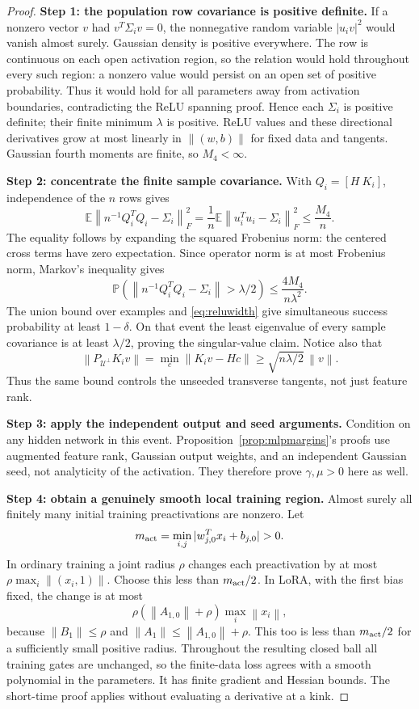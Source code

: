 \documentclass[12pt,a4paper]{article}
\theoremstyle{readable}
\theoremstyle{definition}\newtheorem{example}[theorem]{Example}
\newcommand{\norm}[1]{\left\|#1\right\|}
\begin{document}
\begin{proof}
\textbf{Step 1: the population row covariance is positive definite.} If a nonzero vector \(v\) had \(v^T\Sigma_iv=0\), the nonnegative random variable \(|u_iv|^2\) would vanish almost surely. Gaussian density is positive everywhere. The row is continuous on each open activation region, so the relation would hold throughout every such region: a nonzero value would persist on an open set of positive probability. Thus it would hold for all parameters away from activation boundaries, contradicting the ReLU spanning proof. Hence each \(\Sigma_i\) is positive definite; their finite minimum \(\lambda\) is positive. ReLU values and these directional derivatives grow at most linearly in \(\norm{(w,b)}\) for fixed data and tangents. Gaussian fourth moments are finite, so \(M_4<\infty\).

\textbf{Step 2: concentrate the finite sample covariance.} With \(Q_i=[H\ K_i]\), independence of the \(n\) rows gives
\[
\mathbb E\norm{n^{-1}Q_i^TQ_i-\Sigma_i}_F^2
=\frac1n\mathbb E\norm{u_i^Tu_i-\Sigma_i}_F^2
\le\frac{M_4}{n}.
\]
The equality follows by expanding the squared Frobenius norm: the centered cross terms have zero expectation. Since operator norm is at most Frobenius norm, Markov's inequality gives
\[
\mathbb P\!\left(\norm{n^{-1}Q_i^TQ_i-\Sigma_i}>\lambda/2\right)
\le\frac{4M_4}{n\lambda^2}.
\]
The union bound over examples and \eqref{eq:reluwidth} give simultaneous success probability at least \(1-\delta\). On that event the least eigenvalue of every sample covariance is at least \(\lambda/2\), proving the singular-value claim. Notice also that
\[
\norm{P_{\mathcal U^\perp}K_iv}
=\min_c\norm{K_iv-Hc}
\ge\sqrt{n\lambda/2}\,\norm v.
\]
Thus the same bound controls the unseeded transverse tangents, not just feature rank.

\textbf{Step 3: apply the independent output and seed arguments.} Condition on any hidden network in this event. Proposition~\ref{prop:mlpmargins}'s proofs use augmented feature rank, Gaussian output weights, and an independent Gaussian seed, not analyticity of the activation. They therefore prove \(\gamma,\mu>0\) here as well.

\textbf{Step 4: obtain a genuinely smooth local training region.} Almost surely all finitely many initial training preactivations are nonzero. Let
\[
m_{\rm act}=\min_{i,j}|w_{j,0}^Tx_i+b_{j,0}|>0.
\]
In ordinary training a joint radius \(\rho\) changes each preactivation by at most
\(\rho\max_i\norm{(x_i,1)}\). Choose this less than \(m_{\rm act}/2\). In LoRA, with the first bias fixed, the change is at most
\[
\rho(\norm{A_{1,0}}+\rho)\max_i\norm{x_i},
\]
because \(\norm{B_1}\le\rho\) and \(\norm{A_1}\le\norm{A_{1,0}}+\rho\). This too is less than \(m_{\rm act}/2\) for a sufficiently small positive radius. Throughout the resulting closed ball all training gates are unchanged, so the finite-data loss agrees with a smooth polynomial in the parameters. It has finite gradient and Hessian bounds. The short-time proof applies without evaluating a derivative at a kink.


\end{proof}
\end{document}
